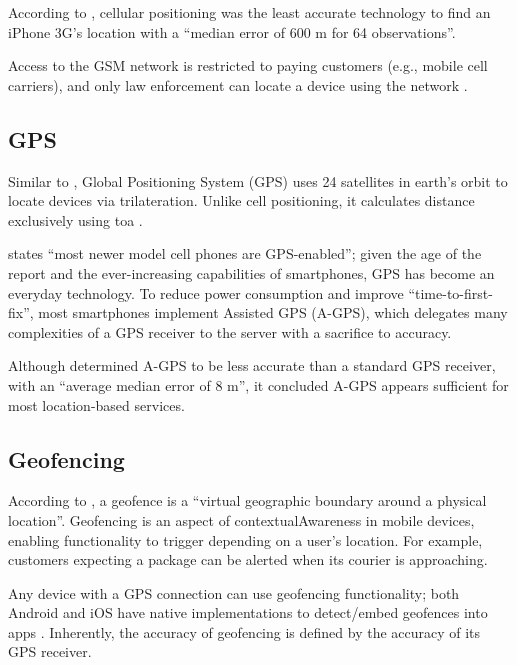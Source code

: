 According to \cite{locationComparison}, cellular
positioning was the least accurate technology to find an
iPhone 3G's location with a \enquote{median error of 600 m
  for 64 observations}.

Access to the GSM network is restricted to paying customers
(e.g., mobile cell carriers), and only law enforcement can
locate a device using the network
\parencite{howCellTowerTriWorks}.

\subsection{GPS} \label{ss:gps}

Similar to ,
Global Positioning System (GPS) uses 24 satellites in
earth's orbit to locate devices via \gls{trilateration}.
Unlike cell positioning, it calculates distance exclusively
using \gls{toa} \parencite{suveryOfCellPos}.

\cite{locationComparison} states \enquote{most newer model
  cell phones are GPS-enabled}; given the age of the report
and the ever-increasing capabilities of smartphones, GPS
has become an everyday technology.
To reduce power consumption and improve
\enquote{time-to-first-fix}, most smartphones implement
Assisted GPS (A-GPS), which delegates many complexities of
a GPS receiver to the server with a sacrifice to accuracy.

Although \cite{locationComparison} determined A-GPS to be
less accurate than a standard GPS receiver, with an
\enquote{average median error of 8 m}, it concluded A-GPS
appears sufficient for most location-based services.

\subsection{Geofencing}

According to \cite{whatIsGeofencing}, a geofence is a
\enquote{virtual geographic boundary around a physical
  location}.
Geofencing is an aspect of \gls{contextualAwareness} in
mobile devices, enabling functionality to trigger depending
on a user's location.
For example, customers expecting a package can be alerted
when its courier is approaching.

Any device with a GPS connection can use geofencing
functionality; both Android and iOS have native
implementations to detect/embed geofences into apps
\parencite{androidGeofencingApi,iosGeofencingApi}.
Inherently, the accuracy of geofencing is defined by the
accuracy of its GPS receiver.

